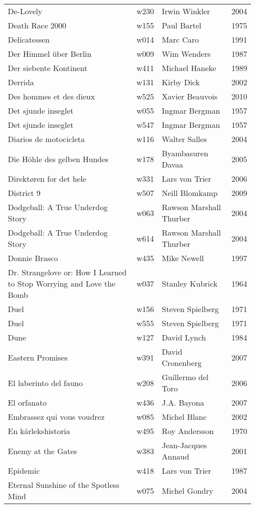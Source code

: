 \documentclass{article}
\begin{document}
\begin {center}
\begin{longtable}{p{10cm} l l l}
De-Lovely & w230 & Irwin Winkler & 2004 \\
Death Race 2000 & w155 & Paul Bartel & 1975 \\
Delicatessen & w014 & Marc Caro & 1991 \\
Der Himmel über Berlin & w009 & Wim Wenders & 1987 \\
Der siebente Kontinent & w411 & Michael Haneke & 1989 \\
Derrida & w131 & Kirby Dick & 2002 \\
Des hommes et des dieux & w525 & Xavier Beauvois & 2010 \\
Det sjunde inseglet & w055 & Ingmar Bergman & 1957 \\
Det sjunde inseglet & w547 & Ingmar Bergman & 1957 \\
Diarios de motocicleta & w116 & Walter Salles & 2004 \\
Die Höhle des gelben Hundes & w178 & Byambasuren Davaa & 2005 \\
Direktøren for det hele & w331 & Lars von Trier & 2006 \\
District 9 & w507 & Neill Blomkamp & 2009 \\
Dodgeball: A True Underdog Story & w063 & Rawson Marshall Thurber & 2004 \\
Dodgeball: A True Underdog Story & w614 & Rawson Marshall Thurber & 2004 \\
Donnie Brasco & w435 & Mike Newell & 1997 \\
Dr. Strangelove or: How I Learned to Stop Worrying and Love the Bomb & w037 & Stanley Kubrick & 1964 \\
Duel & w156 & Steven Spielberg & 1971 \\
Duel & w555 & Steven Spielberg & 1971 \\
Dune & w127 & David Lynch & 1984 \\
Eastern Promises & w391 & David Cronenberg & 2007 \\
El laberinto del fauno & w208 & Guillermo del Toro & 2006 \\
El orfanato & w436 & J.A. Bayona & 2007 \\
Embrassez qui vous voudrez & w085 & Michel Blanc & 2002 \\
En kärlekshistoria & w495 & Roy Andersson & 1970 \\
Enemy at the Gates & w383 & Jean-Jacques Annaud & 2001 \\
Epidemic & w418 & Lars von Trier & 1987 \\
Eternal Sunshine of the Spotless Mind & w075 & Michel Gondry & 2004 \\

\end{longtable}
\end{center}
\end{document}
